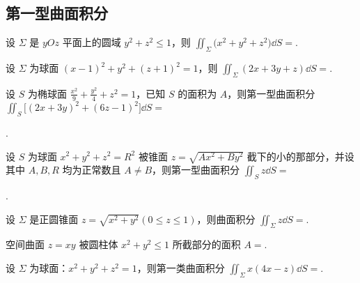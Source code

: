 \subsection{第一型曲面积分}

	\begin{ti}
		设 $\varSigma$ 是 $yOz$ 平面上的圆域 $y^{2} + z^{2} \leq 1$，则 $\iint_{\varSigma} \bigl( x^{2} + y^{2} + z^{2} \bigr) \dd{S} = $\kuo.

	\end{ti}

	\begin{ti}
		设 $\varSigma$ 为球面 $(x - 1)^{2} + y^{2} + (z + 1)^{2} = 1$，则 $\iint_{\varSigma} (2x + 3y + z) \dd{S} = $\kuo.
		
		\fourch{$4\uppi$}{$2\uppi$}{$\uppi$}{$0$}
	\end{ti}

	\begin{ti}
		设 $S$ 为椭球面 $\frac{x^{2}}{9} + \frac{y^{2}}{4} + z^{2} = 1$，已知 $S$ 的面积为 $A$，则第一型曲面积分 $\iint_{S} \bigl[ (2x + 3y)^{2} + (6z - 1)^{2} \bigr] \dd{S} = $
		
		\noindent\htwo.
	\end{ti}

	\begin{ti}
		设 $S$ 为球面 $x^{2} + y^{2} + z^{2} = R^{2}$ 被锥面 $z = \sqrt{Ax^{2} + By^{2}}$ 截下的小的那部分，并设其中 $A, B, R$ 均为正常数且 $A \ne B$，则第一型曲面积分 $\iint_{S} z \dd{S} = $

		\noindent\htwo.
	\end{ti}

	\begin{ti}
		设 $\varSigma$ 是正圆锥面 $z = \sqrt{x^{2} + y^{2}} (0 \leq z \leq 1)$，则曲面积分 $\iint_{\varSigma} z \dd{S} = $\kuo.

		\fourch{$\frac{2\sqrt{2}}{3}\uppi$}{$\frac{\sqrt{2}}{3}\uppi$}{$\sqrt{2}\uppi$}{$\uppi$}
	\end{ti}

	\begin{ti}
		空间曲面 $z = xy$ 被圆柱体 $x^{2} + y^{2} \leq 1$ 所截部分的面积 $A = $\htwo.
	\end{ti}

	\begin{ti}
		设 $\varSigma$ 为球面：$x^{2} + y^{2} + z^{2} = 1$，则第一类曲面积分 $\iint_{\varSigma} x (4x - z) \dd{S} = $\htwo.
	\end{ti}

